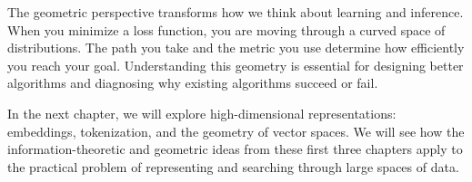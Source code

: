 The geometric perspective transforms how we think about learning and inference. When you minimize a loss function, you are moving through a curved space of distributions. The path you take and the metric you use determine how efficiently you reach your goal. Understanding this geometry is essential for designing better algorithms and diagnosing why existing algorithms succeed or fail.

In the next chapter, we will explore high-dimensional representations: embeddings, tokenization, and the geometry of vector spaces. We will see how the information-theoretic and geometric ideas from these first three chapters apply to the practical problem of representing and searching through large spaces of data.
